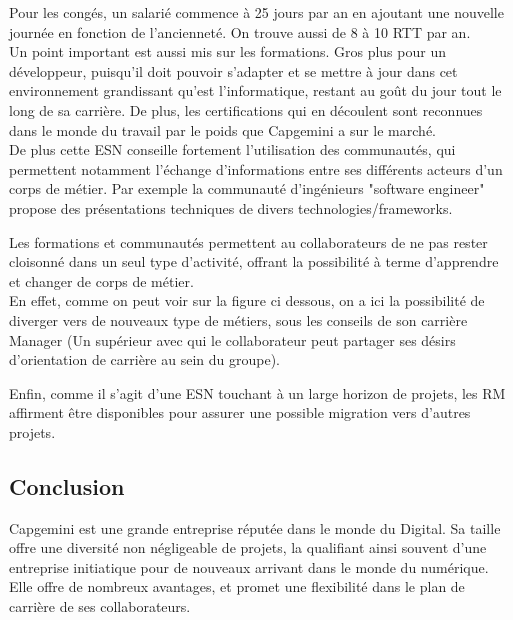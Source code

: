 \documentclass{rapport}
\begin{document}
Pour les congés, un salarié commence à 25 jours par an en ajoutant une nouvelle journée en fonction de l'ancienneté. On trouve aussi de 8 à 10 RTT par an.\\

Un point important est aussi mis sur les formations. Gros plus pour un développeur, puisqu'il doit pouvoir s'adapter et se mettre à jour dans cet environnement grandissant qu'est l'informatique, restant au goût du jour tout le long de sa carrière. De plus, les certifications qui en découlent sont reconnues dans le monde du travail par le poids que Capgemini a sur le marché.\\

De plus cette ESN conseille fortement l'utilisation des communautés, qui permettent notamment l'échange d'informations entre ses différents acteurs d'un corps de métier. Par exemple la communauté d'ingénieurs "software engineer" propose des présentations techniques de divers technologies/frameworks.

Les formations et communautés permettent au collaborateurs de ne pas rester cloisonné dans un seul type d'activité, offrant la possibilité à terme d'apprendre et changer de corps de métier.\\

En effet, comme on peut voir sur la figure ci dessous, on a ici la possibilité de diverger vers de nouveaux type de métiers, sous les conseils de son carrière Manager (Un supérieur avec qui le collaborateur peut partager ses désirs d'orientation de carrière au sein du groupe).\\


Enfin, comme il s'agit d'une ESN touchant à un large horizon de projets, les RM affirment être disponibles pour assurer une possible migration vers d'autres projets. 

\subsection*{Conclusion}

Capgemini est une grande entreprise réputée dans le monde du Digital. Sa taille offre une diversité non négligeable de projets, la qualifiant ainsi souvent d'une entreprise initiatique pour de nouveaux arrivant dans le monde du numérique.
Elle offre de nombreux avantages, et promet une flexibilité dans le plan de carrière de ses collaborateurs.
\end{document}
